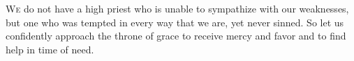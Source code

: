 \lettrine[lines=3,loversize=0.15]{W}{e} do not have a high priest who is unable to sympathize with our weaknesses, but one who was tempted in every way that we are, yet never sinned. So let us confidently approach the throne of grace to receive mercy and favor and to find help in time of need.
